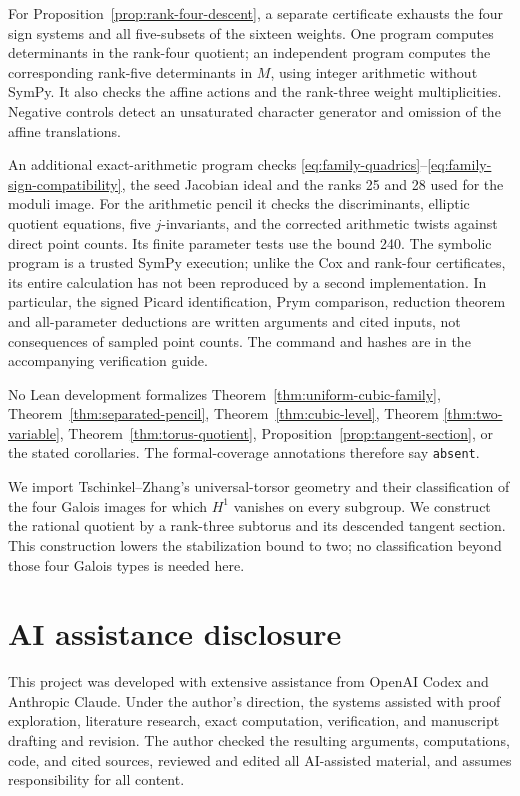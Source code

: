 \documentclass[11pt]{article}
\theoremstyle{remark}
\begin{document}
For Proposition~\ref{prop:rank-four-descent}, a separate certificate exhausts
the four sign systems and all five-subsets of the sixteen weights.  One
program computes determinants in the rank-four quotient; an independent
program computes the corresponding rank-five determinants in \(M\), using
integer arithmetic without SymPy.  It also checks the affine actions and
the rank-three weight multiplicities.  Negative controls detect an
unsaturated character generator and omission of the affine translations.

An additional exact-arithmetic program checks
\eqref{eq:family-quadrics}--\eqref{eq:family-sign-compatibility}, the seed
Jacobian ideal and the ranks 25 and 28 used for the moduli image. For the
arithmetic pencil it checks the discriminants, elliptic quotient equations,
five \(j\)-invariants, and the corrected arithmetic twists against direct
point counts. Its finite parameter tests use the bound 240. The symbolic
program is a trusted SymPy execution; unlike the Cox and rank-four
certificates, its entire calculation has not been reproduced by a second
implementation. In particular, the signed Picard identification, Prym
comparison, reduction theorem and all-parameter deductions are written
arguments and cited inputs, not consequences of sampled point counts.
The command and hashes are in the accompanying verification guide.

No Lean development formalizes Theorem~\ref{thm:uniform-cubic-family},
Theorem~\ref{thm:separated-pencil}, Theorem~\ref{thm:cubic-level}, Theorem
\ref{thm:two-variable}, Theorem~\ref{thm:torus-quotient},
Proposition~\ref{prop:tangent-section}, or the stated corollaries.  The
formal-coverage annotations therefore say
\texttt{absent}.

We import Tschinkel--Zhang's universal-torsor geometry and their classification
of the four Galois images for which \(H^1\) vanishes on every subgroup.  We
construct the rational quotient by a rank-three subtorus and its descended
tangent section.  This construction lowers the stabilization bound to two; no
classification beyond those four Galois types is needed here.

\section*{AI assistance disclosure}
This project was developed with extensive assistance from OpenAI Codex and
Anthropic Claude. Under the author's direction, the systems assisted with
proof exploration, literature research, exact computation, verification,
and manuscript drafting and revision. The author checked the resulting
arguments, computations, code, and cited sources, reviewed and edited all
AI-assisted material, and assumes responsibility for all content.
\end{document}
